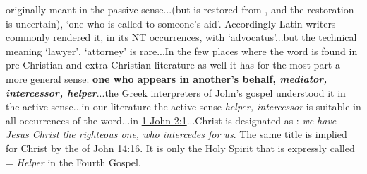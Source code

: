 				\begin{compactdesc}
				
					\item[BDAG 680b] originally meant in the passive sense...(but  is restored from , and the restoration is uncertain), `one who is called to someone's aid'. Accordingly Latin writers commonly rendered it, in its NT occurrences, with `advocatus'...but the technical meaning `lawyer', `attorney' is rare...In the few places where the word is found in pre-Christian and extra-Christian literature as well it has for the most part a more general sense: \textbf{one who appears in another's behalf, \textit{mediator, intercessor, helper}}...the Greek interpreters of John's gospel understood it in the active sense...in our literature the active sense \textit{helper, intercessor} is suitable in all occurrences of the word...in \hyperref[1JOHN-2-1]{1 John 2:1}...Christ is designated as :  \textit{we have Jesus Christ the righteous one, who intercedes for us}. The same title is implied for Christ by the  of \hyperref[JOHN-14-16]{John 14:16}. It is only the Holy Spirit that is expressly called  = \textit{Helper} in the Fourth Gospel.
					
					
					

\end{compactdesc}
